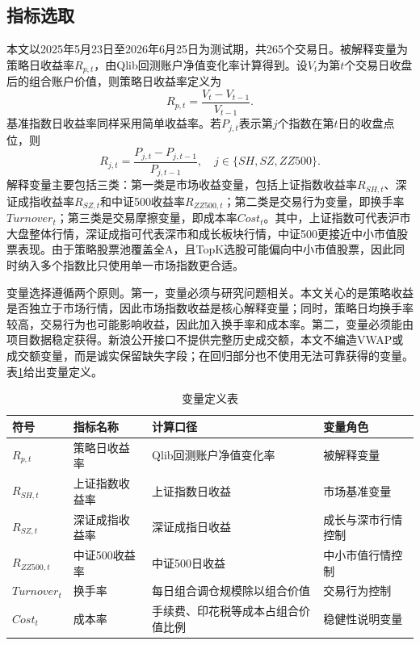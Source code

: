 \documentclass[UTF8,a4paper,12pt]{ctexart}
\begin{document}
\subsection{指标选取}
本文以2025年5月23日至2026年6月25日为测试期，共265个交易日。被解释变量为策略日收益率$R_{p,t}$，由Qlib回测账户净值变化率计算得到。设$V_t$为第$t$个交易日收盘后的组合账户价值，则策略日收益率定义为
\begin{equation}
R_{p,t}=\frac{V_t-V_{t-1}}{V_{t-1}}.
\end{equation}
基准指数日收益率同样采用简单收益率。若$P_{j,t}$表示第$j$个指数在第$t$日的收盘点位，则
\begin{equation}
R_{j,t}=\frac{P_{j,t}-P_{j,t-1}}{P_{j,t-1}},\quad j\in\{SH,SZ,ZZ500\}.
\end{equation}
解释变量主要包括三类：第一类是市场收益变量，包括上证指数收益率$R_{SH,t}$、深证成指收益率$R_{SZ,t}$和中证500收益率$R_{ZZ500,t}$；第二类是交易行为变量，即换手率$Turnover_t$；第三类是交易摩擦变量，即成本率$Cost_t$。其中，上证指数可代表沪市大盘整体行情，深证成指可代表深市和成长板块行情，中证500更接近中小市值股票表现。由于策略股票池覆盖全A，且TopK选股可能偏向中小市值股票，因此同时纳入多个指数比只使用单一市场指数更合适。

变量选择遵循两个原则。第一，变量必须与研究问题相关。本文关心的是策略收益是否独立于市场行情，因此市场指数收益是核心解释变量；同时，策略日均换手率较高，交易行为也可能影响收益，因此加入换手率和成本率。第二，变量必须能由项目数据稳定获得。新浪公开接口不提供完整历史成交额，本文不编造VWAP或成交额变量，而是诚实保留缺失字段；在回归部分也不使用无法可靠获得的变量。表\ref{tab:variables}给出变量定义。

\begin{table}[H]
\centering
\caption{变量定义表}
\label{tab:variables}
\small
\begin{tabular}{p{2.0cm}p{2.2cm}p{4.5cm}p{2.5cm}}
\toprule
符号 & 指标名称 & 计算口径 & 变量角色 \\
\midrule
$R_{p,t}$ & 策略日收益率 & Qlib回测账户净值变化率 & 被解释变量 \\
$R_{SH,t}$ & 上证指数收益率 & 上证指数日收益 & 市场基准变量 \\
$R_{SZ,t}$ & 深证成指收益率 & 深证成指日收益 & 成长与深市行情控制 \\
$R_{ZZ500,t}$ & 中证500收益率 & 中证500日收益 & 中小市值行情控制 \\
$Turnover_t$ & 换手率 & 每日组合调仓规模除以组合价值 & 交易行为控制 \\
$Cost_t$ & 成本率 & 手续费、印花税等成本占组合价值比例 & 稳健性说明变量 \\
\bottomrule
\end{tabular}
\end{table}
\end{document}
